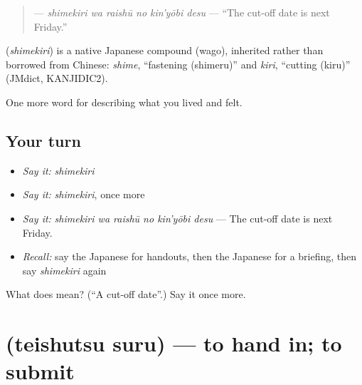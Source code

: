 \begin{quote}
\textbf{  } — \emph{shimekiri wa raishū no kin'yōbi desu} — \textquotedblleft{}The cut-off date is next Friday.\textquotedblright{}
\end{quote}

\begin{cousinweb}
\textbf{} (\emph{shimekiri}) is a native Japanese compound (wago), inherited rather than borrowed from Chinese: \emph{shime}, \textquotedblleft{}fastening (shimeru)\textquotedblright{} and \emph{kiri}, \textquotedblleft{}cutting (kiru)\textquotedblright{} (JMdict, KANJIDIC2).
\end{cousinweb}

\begin{grammarlens}[title={What you've built}]
One more word for describing what you lived and felt.
\end{grammarlens}

\subsection*{Your turn}
\begin{itemize}
\raggedright
  \item \emph{Say it:} \emph{shimekiri}
  \item \emph{Say it:} \emph{shimekiri}, once more
  \item \emph{Say it:} \emph{shimekiri wa raishū no kin'yōbi desu} — The cut-off date is next Friday.
  \item \emph{Recall:} say the Japanese for handouts, then the Japanese for a briefing, then say \emph{shimekiri} again
\end{itemize}

\begin{tcolorbox}[breakable,colback=teal!4,colframe=teal!35!black,title={Before you move on}]
What does  mean? (\textquotedblleft{}A cut-off date\textquotedblright{}.) Say it once more.
\end{tcolorbox}
\section[\texorpdfstring{\ja{ていしゅつする} (teishutsu suru)}{ていしゅつする (teishutsu suru)}]{ (teishutsu suru) — to hand in; to submit}

\label{lesson:JA-C453-teishutsu-suru}



